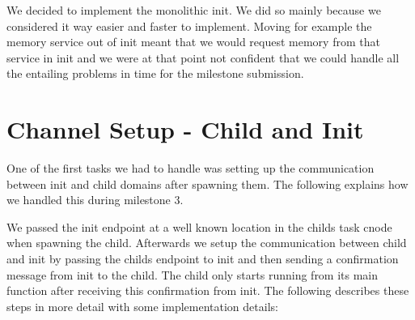 We decided to implement the monolithic init. We did so mainly because we considered it way easier and faster to implement. Moving for example the memory service out of init meant that we would request memory from that service in init and we were at that point not confident that we could handle all the entailing problems in time for the milestone submission.

\section{Channel Setup - Child and Init}

One of the first tasks we had to handle was setting up the communication between init and child domains after spawning them. The following explains how we handled this during milestone 3.

We passed the init endpoint at a well known location in the childs task cnode when spawning the child. Afterwards we setup the communication between child and init by passing the childs endpoint to init and then sending a confirmation message from init to the child. The child only starts running from its main function after receiving this confirmation from init. The following describes these steps in more detail with some implementation details:


